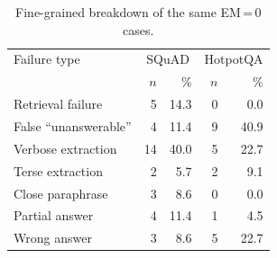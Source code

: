 \begin{table}[h]
\centering
\caption{Fine-grained breakdown of the same EM\,=\,0 cases.}
\label{tab:error-analysis-fine}
\begin{tabular}{lrrrr}
\toprule
Failure type & \multicolumn{2}{c}{SQuAD} & \multicolumn{2}{c}{HotpotQA} \\
 & $n$ & \% & $n$ & \% \\
\midrule
Retrieval failure & 5 & 14.3 & 0 & 0.0 \\
False ``unanswerable'' & 4 & 11.4 & 9 & 40.9 \\
Verbose extraction & 14 & 40.0 & 5 & 22.7 \\
Terse extraction & 2 & 5.7 & 2 & 9.1 \\
Close paraphrase & 3 & 8.6 & 0 & 0.0 \\
Partial answer & 4 & 11.4 & 1 & 4.5 \\
Wrong answer & 3 & 8.6 & 5 & 22.7 \\
\bottomrule
\end{tabular}
\end{table}
